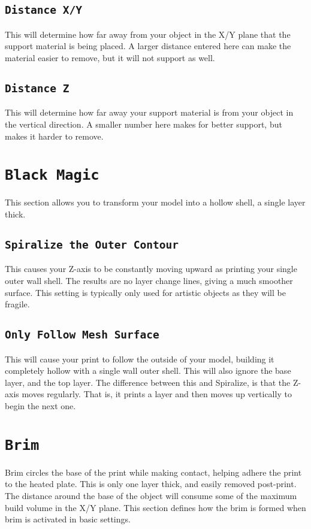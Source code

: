 \subsection{\texttt{Distance X/Y}}
This will determine how far away from your object in the X/Y plane that the support material is being placed. A larger distance entered here can make the material easier to remove, but it will not support as well.

\subsection{\texttt{Distance Z}}
This will determine how far away your support material is from your object in the vertical direction. A smaller number here makes for better support, but makes it harder to remove.

\section{\texttt{Black Magic}}
This section allows you to transform your model into a hollow shell, a single layer thick.

\subsection{\texttt{Spiralize the Outer Contour}}
This causes your Z-axis to be constantly moving upward as printing your single outer wall shell. The results are no layer change lines, giving a much smoother surface. This setting is typically only used for artistic objects as they will be fragile.

\subsection{\texttt{Only Follow Mesh Surface}}
This will cause your print to follow the outside of your model, building it completely hollow with a single wall outer shell. This will also ignore the base layer, and the top layer. The difference between this and Spiralize, is that the Z-axis moves regularly. That is, it prints a layer and then moves up vertically to begin the next one.

\section{\texttt{Brim}}
Brim circles the base of the print while making contact, helping adhere the print to the heated plate. This is only one layer thick, and easily removed post-print. The distance around the base of the object will consume some of the maximum build volume in the X/Y plane. This section defines how the brim is formed when brim is activated in basic settings.

